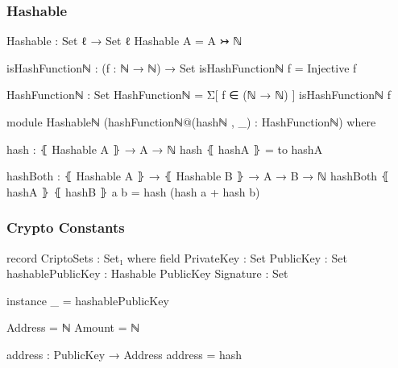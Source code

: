 \documentclass{beamer}
\begin{document}

\begin{frame}
  \frametitle{Hashable}
\begin{code}
Hashable : Set ℓ → Set ℓ
Hashable A = A ↣ ℕ
\end{code}


\begin{code}
isHashFunctionℕ : (f : ℕ → ℕ) → Set
isHashFunctionℕ f = Injective f

HashFunctionℕ : Set
HashFunctionℕ = Σ[ f ∈ (ℕ → ℕ) ] isHashFunctionℕ f

module Hashableℕ
  (hashFunctionℕ@(hashℕ , _) : HashFunctionℕ) where

  hash : ⦃ Hashable A ⦄ → A → ℕ
  hash ⦃ hashA ⦄ = to hashA

  hashBoth : ⦃ Hashable A ⦄ → ⦃ Hashable B ⦄ → A → B → ℕ
  hashBoth ⦃ hashA ⦄ ⦃ hashB ⦄ a b = hash (hash a + hash b)
\end{code}


\end{frame}


\begin{frame}
  \frametitle{Crypto Constants}
\begin{code}
  record CriptoSets : Set₁ where
    field
      PrivateKey         : Set
      PublicKey          : Set
      hashablePublicKey  : Hashable PublicKey
      Signature          : Set

    instance
      _ = hashablePublicKey

    Address = ℕ
    Amount  = ℕ

    address : PublicKey → Address
    address = hash
\end{code}

\end{frame}
\end{document}
